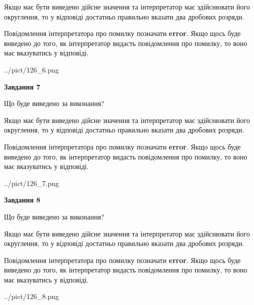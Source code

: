 \documentclass[12pt, ukrainian]{article}
\begin{document}
{\begin {Large}
Якщо має бути виведено дійсне значення та інтерпретатор має здійснювати його округлення, 
то у відповіді достатньо правильно вказати два дробових розряди.

Повідомлення інтерпретатора про помилку позначати \textbf{error}.
Якщо щось буде виведено до того, як інтерпретатор видасть повідомлення про помилку, 
то воно має вказуватись у відповіді. \par

\begin{center}
	{../pict/126_6.png}
\end{center}
\newpage

{\begin {center}\textbf{Завдання 7}\end {center}}\par
Що буде виведено за виконання? \par

Якщо має бути виведено дійсне значення та інтерпретатор має здійснювати його округлення, 
то у відповіді достатньо правильно вказати два дробових розряди.

Повідомлення інтерпретатора про помилку позначати \textbf{error}.
Якщо щось буде виведено до того, як інтерпретатор видасть повідомлення про помилку, 
то воно має вказуватись у відповіді. \par

\begin{center}
	{../pict/126_7.png}
\end{center}
\newpage

{\begin {center}\textbf{Завдання 8}\end {center}}\par
Що буде виведено за виконання? \par

Якщо має бути виведено дійсне значення та інтерпретатор має здійснювати його округлення, 
то у відповіді достатньо правильно вказати два дробових розряди.

Повідомлення інтерпретатора про помилку позначати \textbf{error}.
Якщо щось буде виведено до того, як інтерпретатор видасть повідомлення про помилку, 
то воно має вказуватись у відповіді. \par

\begin{center}
	{../pict/126_8.png}
\end{center}
\newpage


\end{Large}}
\end{document}

